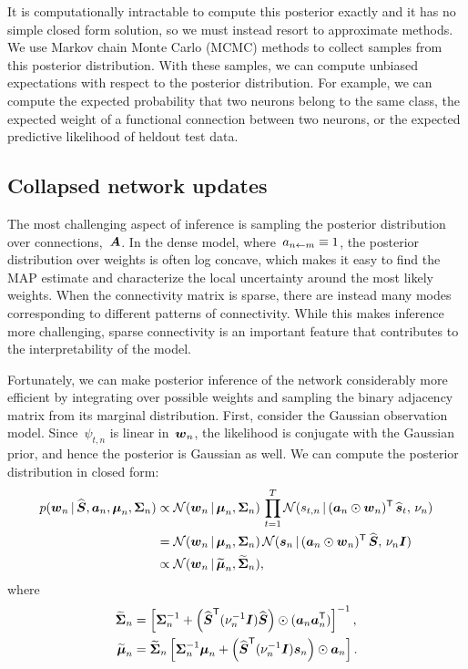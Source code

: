It is computationally intractable to compute this posterior exactly and it has no simple closed form solution, so we must instead resort to approximate methods. 
We use Markov chain Monte Carlo (MCMC) methods to collect samples from this posterior distribution.
With these samples, we can compute unbiased expectations with respect to the posterior distribution.
For example, we can compute the expected probability that two neurons belong to the same class, the expected weight of a functional connection between two neurons, or the expected predictive likelihood of heldout test data.


\subsection{Collapsed network updates}
The most challenging aspect of inference is sampling the
posterior distribution over connections,~$\boldsymbol{A}$. In the
dense model, where~$a_{n \leftarrow m} \equiv 1$, the posterior
distribution over weights is often log concave, which
makes it easy to find the MAP estimate and characterize
the local uncertainty around the most likely weights.
When the connectivity matrix is sparse, there are instead
many modes corresponding to different patterns of
connectivity. While this makes inference more challenging,
sparse connectivity is an important feature that
contributes to the interpretability of the model.

Fortunately, we can make posterior inference of the
network considerably more efficient by integrating over
possible weights and sampling the binary adjacency
matrix from its marginal distribution. 
First, consider the Gaussian observation model.
Since~$\psi_{t,n}$ is linear in~$\boldsymbol{w}_n$, the likelihood
is conjugate with the Gaussian prior, and hence the
posterior is Gaussian as well. We can
compute the posterior distribution in closed form:
\begin{align}
  p(\boldsymbol{w}_n \,|\, \widehat{\boldsymbol{S}}, \boldsymbol{a}_n, \boldsymbol{\mu}_n, \boldsymbol{\Sigma}_n)
  &\propto
  \mathcal{N}(\boldsymbol{w}_n \,|\, \boldsymbol{\mu}_n, \boldsymbol{\Sigma}_n) \,
  \prod_{t=1}^T \mathcal{N}(s_{t,n} \,|\, (\boldsymbol{a}_n \odot \boldsymbol{w}_n)^{\mathsf{T}} \, \widehat{\boldsymbol{s}}_t, \, \nu_n) \\
  &= \mathcal{N}(\boldsymbol{w}_n \,|\, \boldsymbol{\mu}_n, \boldsymbol{\Sigma}_n) \,
  \mathcal{N}(\boldsymbol{s}_n \,|\, (\boldsymbol{a}_n \odot \boldsymbol{w}_n)^{\mathsf{T}} \, \widehat{\boldsymbol{S}}, \, \nu_n \boldsymbol{I}) \\
  \label{eq:w_conditional}
  &\propto \mathcal{N}(\boldsymbol{w}_n \,|\, \widetilde{\boldsymbol{\mu}}_n, \widetilde{\boldsymbol{\Sigma}}_n),
\end{align}
where
\begin{align}
  \widetilde{\boldsymbol{\Sigma}}_n &= \left[ \boldsymbol{\Sigma}_n^{-1} +
  \left(\widehat{\boldsymbol{S}}^{\mathsf{T}} (\nu_n^{-1} \boldsymbol{I}) \widehat{\boldsymbol{S}} \right) \odot (\boldsymbol{a}_n \boldsymbol{a}_n^{\mathsf{T}}) \right]^{-1}, \\
  \widetilde{\boldsymbol{\mu}}_n &= \widetilde{\boldsymbol{\Sigma}}_n \left[ \boldsymbol{\Sigma}_n^{-1} \boldsymbol{\mu}_n +
  \left(\widehat{\boldsymbol{S}}^{\mathsf{T}} (\nu_n^{-1} \boldsymbol{I})\boldsymbol{s}_n \right) \odot \boldsymbol{a}_n \right].
\end{align}

